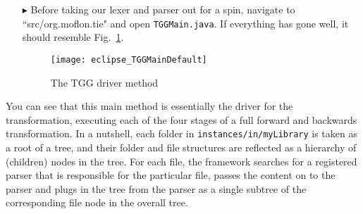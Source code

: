 \begin{itemize}


\item[$\blacktriangleright$] Before taking our lexer and parser out for a spin, navigate to ``src/org.moflon.tie" and open \texttt{TGGMain.java}. If everything
has gone well, it should resemble Fig.~\ref{eclipse:defaultTGGMain}.

\vspace{0.5cm}

\begin{figure}[!htbp]
\begin{center}
 \texttt{[image: eclipse\_TGGMainDefault]}
  \caption{The TGG driver method}
  \label{eclipse:defaultTGGMain}
\end{center}
\end{figure}

\end{itemize}

You can see that this main method is essentially the driver for the transformation, executing each of the four stages of a full forward and backwards
transformation. In a nutshell, each folder in \texttt{instances/in/myLibrary} is taken as a root of a tree, and their folder and file structures are reflected
as a hierarchy of (children) nodes in the tree. For each file, the framework searches for a registered parser that is responsible for the particular file,
passes the content on to the parser and plugs in the tree from the parser as a single subtree of the corresponding file node in the overall tree.

